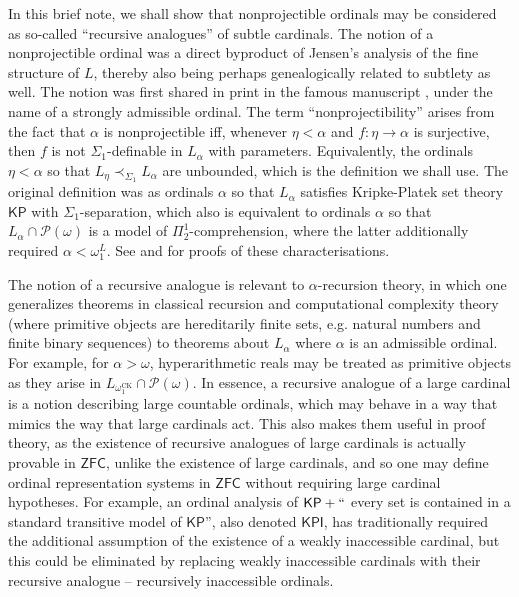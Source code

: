 \documentclass{article}
\newcommand{\KP}{\mathsf{KP}}
\newcommand{\ZFC}{\mathsf{ZFC}}
\theoremstyle{definition}
\theoremstyle{plain}
\theoremstyle{plain}
\theoremstyle{plain}
\theoremstyle{plain}
\theoremstyle{remark}
\theoremstyle{remark}
\theoremstyle{remark}
\theoremstyle{plain}
\theoremstyle{plain}
\theoremstyle{plain}
\begin{document}
In this brief note, we shall show that nonprojectible ordinals may be considered as so-called ``recursive analogues'' of subtle cardinals. The notion of a nonprojectible ordinal was a direct byproduct of Jensen's analysis of the fine structure of $L$, thereby also being perhaps genealogically related to subtlety as well. The notion was first shared in print in the famous manuscript \cite{jensen2}, under the name of a strongly admissible ordinal. The term ``nonprojectibility'' arises from the fact that $\alpha$ is nonprojectible iff, whenever $\eta < \alpha$ and $f: \eta \to \alpha$ is surjective, then $f$ is not $\Sigma_1$-definable in $L_\alpha$ with parameters. Equivalently, the ordinals $\eta < \alpha$ so that $L_\eta \prec_{\Sigma_1} L_\alpha$ are unbounded, which is the definition we shall use. The original definition was as ordinals $\alpha$ so that $L_\alpha$ satisfies Kripke-Platek set theory $\KP$ with $\Sigma_1$-separation, which also is equivalent to ordinals $\alpha$ so that $L_\alpha \cap \mathcal{P}(\omega)$ is a model of $\Pi^1_2$-comprehension, where the latter additionally required $\alpha < \omega_1^L$. See \cite{barwise} and \cite{simpson} for proofs of these characterisations.

The notion of a recursive analogue is relevant to $\alpha$-recursion theory, in which one generalizes theorems in classical recursion and computational complexity theory (where primitive objects are hereditarily finite sets, e.g. natural numbers and finite binary sequences) to theorems about $L_\alpha$ where $\alpha$ is an admissible ordinal. For example, for $\alpha > \omega$, hyperarithmetic reals may be treated as primitive objects as they arise in $L_{\omega_1^{\mathrm{CK}}} \cap \mathcal{P}(\omega)$. In essence, a recursive analogue of a large cardinal is a notion describing large countable ordinals, which may behave in a way that mimics the way that large cardinals act. This also makes them useful in proof theory, as the existence of recursive analogues of large cardinals is actually provable in $\ZFC$, unlike the existence of large cardinals, and so one may define ordinal representation systems in $\ZFC$ without requiring large cardinal hypotheses. For example, an ordinal analysis of $\KP + ``$ every set is contained in a standard transitive model of $\KP$'', also denoted $\mathsf{KPI}$, has traditionally required the additional assumption of the existence of a weakly inaccessible cardinal, but this could be eliminated by replacing weakly inaccessible cardinals with their recursive analogue -- recursively inaccessible ordinals.
\end{document}
